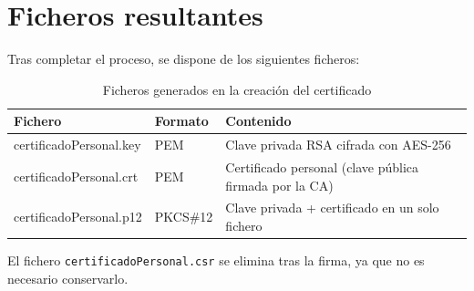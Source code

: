 \section{Ficheros resultantes}

Tras completar el proceso, se dispone de los siguientes ficheros:

\begin{table}[H]
    \centering
    \caption{Ficheros generados en la creación del certificado}
    \begin{tabularx}{\textwidth}{l|l|X}
        \toprule
        \textbf{Fichero} & \textbf{Formato} & \textbf{Contenido} \\
        \midrule
        certificadoPersonal.key & PEM & Clave privada RSA cifrada con AES-256 \\
        certificadoPersonal.crt & PEM & Certificado personal (clave pública firmada por la CA) \\
        certificadoPersonal.p12 & PKCS\#12 & Clave privada + certificado en un solo fichero \\
        \bottomrule
    \end{tabularx}
\end{table}

El fichero \texttt{certificadoPersonal.csr} se elimina tras la firma, ya que no es necesario conservarlo.
